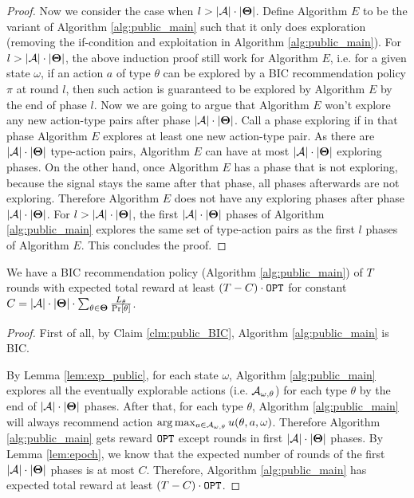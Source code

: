 \begin{proof}
Now we consider the case when $l > |\mathcal{A}| \cdot |\bold{\Theta}|$. Define Algorithm $E$ to be the variant of Algorithm \ref{alg:public_main} such that it only does exploration (removing the if-condition and exploitation in Algorithm \ref{alg:public_main}). For $l > |\mathcal{A}| \cdot |\bold{\Theta}|$, the above induction proof still work for Algorithm $E$, i.e. for a given state $\omega$, if an action $a$ of type $\theta$ can be explored by a BIC recommendation policy $\pi$ at round $l$, then such action is guaranteed to be explored by Algorithm $E$ by the end of phase $l$. Now we are going to argue that Algorithm $E$ won't explore any new action-type pairs after phase $|\mathcal{A}| \cdot |\bold{\Theta}|$. Call a phase exploring if in that phase Algorithm $E$ explores at least one new action-type pair. As there are  $ |\mathcal{A}| \cdot |\bold{\Theta}|$ type-action pairs, Algorithm $E$ can have at most $ |\mathcal{A}| \cdot |\bold{\Theta}|$ exploring phases. On the other hand, once Algorithm $E$ has a phase that is not exploring, because the signal stays the same after that phase, all phases afterwards are not exploring. Therefore Algorithm $E$ does not have any exploring phases after phase $|\mathcal{A}| \cdot |\bold{\Theta}|$. For $l > |\mathcal{A}| \cdot |\bold{\Theta}|$, the first $|   \mathcal{A}| \cdot |\bold{\Theta}|$ phases of Algorithm \ref{alg:public_main} explores the same set of type-action pairs as the first $l$ phases of Algorithm $E$. This concludes the proof.
\end{proof}

\begin{corollary}
\label{cor:public}
We have a BIC recommendation policy (Algorithm \ref{alg:public_main}) of $T$ rounds with expected total reward at least $\left(T - C \right) \cdot \mathtt{OPT}$ for constant $C = |\mathcal{A}| \cdot |\bold{\Theta}| \cdot \sum_{\theta\in\bold{\Theta}} \frac{L_{\theta}}{\Pr[\theta]}$.
\end{corollary}

\begin{proof}
First of all, by Claim \ref{clm:public_BIC}, Algorithm \ref{alg:public_main} is BIC.

By Lemma \ref{lem:exp_public}, for each state $\omega$, Algorithm \ref{alg:public_main} explores all the eventually explorable actions (i.e. $\mathcal{A}_{\omega,\theta}$) for each type $\theta$ by the end of $|\mathcal{A}|\cdot |\bold{\Theta}|$ phases. After that, for each type $\theta$, Algorithm \ref{alg:public_main} will always recommend action $ \arg\max_{a \in \mathcal{A}_{\omega,\theta}} u(\theta, a, \omega)$. Therefore Algorithm \ref{alg:public_main} gets reward $\mathtt{OPT}$ except rounds in first $|\mathcal{A}|\cdot |\bold{\Theta}|$ phases. By Lemma \ref{lem:epoch}, we know that the expected number of rounds of the first  $|\mathcal{A}|\cdot |\bold{\Theta}|$ phases is at most $C$. Therefore, Algorithm \ref{alg:public_main} has expected total reward at least  $\left(T - C \right) \cdot \mathtt{OPT}$.

\end{proof} 